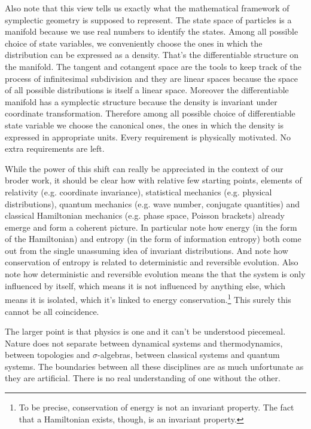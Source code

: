 \documentclass[11pt]{article}
\begin{document}
Also note that this view tells us exactly what the mathematical framework of symplectic geometry is supposed to represent. The state space of particles is a manifold because we use real numbers to identify the states. Among all possible choice of state variables, we conveniently choose the ones in which the distribution can be expressed as a density. That's the differentiable structure on the manifold. The tangent and cotangent space are the tools to keep track of the process of infinitesimal subdivision and they are linear spaces because the space of all possible distributions is itself a linear space. Moreover the differentiable manifold has a symplectic structure because the density is invariant under coordinate transformation. Therefore among all possible choice of differentiable state variable we choose the canonical ones, the ones in which the density is expressed in appropriate units. Every requirement is physically motivated. No extra requirements are left.

While the power of this shift can really be appreciated in the context of our broder work, it should be clear how with relative few starting points, elements of relativity (e.g. coordinate invariance), statistical mechanics (e.g. physical distributions), quantum mechanics (e.g. wave number, conjugate quantities) and classical Hamiltonian mechanics (e.g. phase space, Poisson brackets) already emerge and form a coherent picture. In particular note how energy (in the form of the Hamiltonian) and entropy (in the form of information entropy) both come out from the single unassuming idea of invariant distributions. And note how conservation of entropy is related to deterministic and reversible evolution. Also note how deterministic and reversible evolution means the that the system is only influenced by itself, which means it is not influenced by anything else, which means it is isolated, which it's linked to energy conservation.\footnote{To be precise, conservation of energy is not an invariant property. The fact that a Hamiltonian exists, though, is an invariant property.} This surely this cannot be all coincidence.

The larger point is that physics is one and it can't be understood piecemeal. Nature does not separate between dynamical systems and thermodynamics, between topologies and $\sigma$-algebras, between classical systems and quantum systems. The boundaries between all these disciplines are as much unfortunate as they are artificial. There is no real understanding of one without the other.
\end{document}
